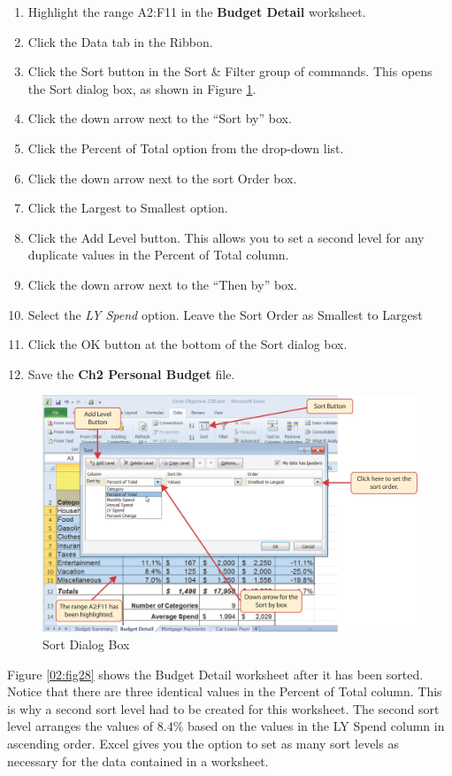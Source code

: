 \begin{enumerate}
	\item Highlight the range \textsf{A2:F11} in the \textbf{Budget Detail} worksheet.
	\item Click the Data tab in the Ribbon.
	\item Click the Sort button in the Sort \& Filter group of commands. This opens the Sort dialog box, as shown in Figure \ref{02:fig27}.
	\item Click the down arrow next to the ``Sort by'' box.
	\item Click the Percent of Total option from the drop-down list.
	\item Click the down arrow next to the sort Order box.
	\item Click the Largest to Smallest option.
	\item Click the Add Level button. This allows you to set a second level for any duplicate values in the Percent of Total column.
	\item Click the down arrow next to the ``Then by'' box.
	\item Select the \textit{LY Spend} option. Leave the Sort Order as Smallest to Largest
	\item Click the OK button at the bottom of the Sort dialog box.
	\item Save the \textbf{Ch2 Personal Budget} file.
\end{enumerate}

\begin{figure}[H]
	\centering
	\includegraphics[width=\maxwidth{.95\linewidth}]{gfx/ch02_fig27}
	\caption{Sort Dialog Box}
	\label{02:fig27}
\end{figure}

Figure \ref{02:fig28} shows the Budget Detail worksheet after it has been sorted. Notice that there are three identical values in the Percent of Total column. This is why a second sort level had to be created for this worksheet. The second sort level arranges the values of $ 8.4\% $ based on the values in the LY Spend column in ascending order. Excel gives you the option to set as many sort levels as necessary for the data contained in a worksheet.

